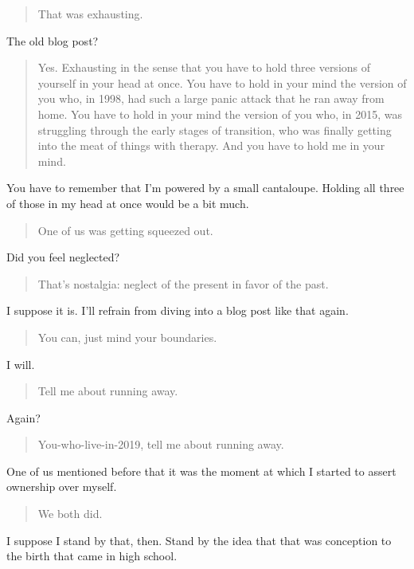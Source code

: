\begin{quote}
That was exhausting.
\end{quote}

The old blog post?

\begin{quote}
Yes. Exhausting in the sense that you have to hold three versions of yourself in your head at once. You have to hold in your mind the version of you who, in 1998, had such a large panic attack that he ran away from home. You have to hold in your mind the version of you who, in 2015, was struggling through the early stages of transition, who was finally getting into the meat of things with therapy. And you have to hold me in your mind.
\end{quote}

You have to remember that I'm powered by a small cantaloupe. Holding all three of those in my head at once would be a bit much.

\begin{quote}
One of us was getting squeezed out.
\end{quote}

Did you feel neglected?

\begin{quote}
That's nostalgia: neglect of the present in favor of the past.
\end{quote}

I suppose it is. I'll refrain from diving into a blog post like that again.

\begin{quote}
You can, just mind your boundaries.
\end{quote}

I will.

\begin{quote}
Tell me about running away.
\end{quote}

Again?

\begin{quote}
You-who-live-in-2019, tell me about running away.
\end{quote}

One of us mentioned before that it was the moment at which I started to assert ownership over myself.

\begin{quote}
We both did.
\end{quote}

I suppose I stand by that, then. Stand by the idea that that was conception to the birth that came in high school.

